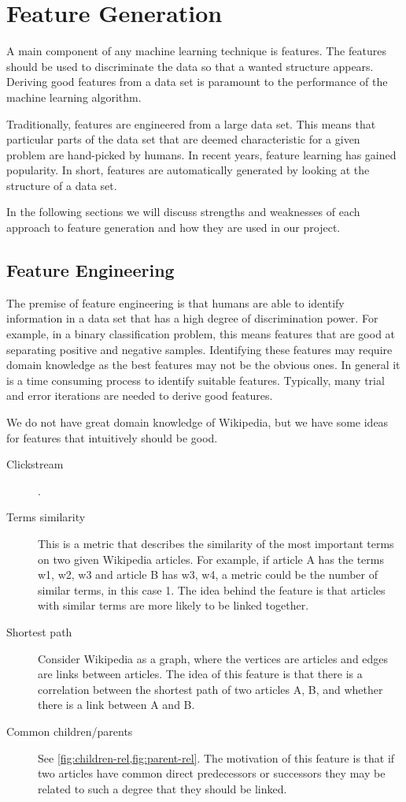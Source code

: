 \section{Feature Generation}
A main component of any machine learning technique is features. The features should be used to discriminate the data so that a wanted structure appears. Deriving good features from a data set is paramount to the performance of the machine learning algorithm.

Traditionally, features are engineered from a large data set. This means that particular parts of the data set that are deemed characteristic for a given problem are hand-picked by humans. In recent years, feature learning has gained popularity. In short, features are automatically generated by looking at the structure of a data set.

In the following sections we will discuss strengths and weaknesses of each approach to feature generation and how they are used in our project.

\subsection{Feature Engineering}
The premise of feature engineering is that humans are able to identify information in a data set that has a high degree of discrimination power. For example, in a binary classification problem, this means features that are good at separating positive and negative samples. Identifying these features may require domain knowledge as the best features may not be the obvious ones. In general it is a time consuming process to identify suitable features. Typically, many trial and error iterations are needed to derive good features.

We do not have great domain knowledge of Wikipedia, but we have some ideas for features that intuitively should be good.

\begin{description}
    \item[Clickstream] .
    \item[Terms similarity] This is a metric that describes the similarity of the most important terms on two given Wikipedia articles. For example, if article A has the terms w1, w2, w3 and article B has w3, w4, a metric could be the number of similar terms, in this case 1. The idea behind the feature is that articles with similar terms are more likely to be linked together.
    \item[Shortest path] Consider Wikipedia as a graph, where the vertices are articles and edges are links between articles. The idea of this feature is that there is a correlation between the shortest path of two articles A, B, and whether there is a link between A and B. 
    \item[Common children/parents] See \cref{fig:children-rel,fig:parent-rel}. The motivation of this feature is that if two articles have common direct predecessors or successors they may be related to such a degree that they should be linked. 
\end{description}


